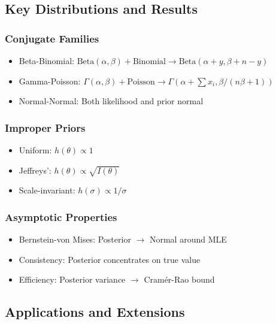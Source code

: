 \subsection{Key Distributions and Results}

\subsubsection{Conjugate Families}

\begin{itemize}
	\item Beta-Binomial: $\text{Beta}(\alpha, \beta) + \text{Binomial} \to \text{Beta}(\alpha + y, \beta + n - y)$
	\item Gamma-Poisson: $\Gamma(\alpha, \beta) + \text{Poisson} \to \Gamma(\alpha + \sum x_i, \beta/(n\beta + 1))$
	\item Normal-Normal: Both likelihood and prior normal
\end{itemize}

\subsubsection{Improper Priors}

\begin{itemize}
	\item Uniform: $h(\theta) \propto 1$
	\item Jeffreys': $h(\theta) \propto \sqrt{I(\theta)}$
	\item Scale-invariant: $h(\sigma) \propto 1/\sigma$
\end{itemize}

\subsubsection{Asymptotic Properties}

\begin{itemize}
	\item Bernstein-von Mises: Posterior $\to$ Normal around MLE
	\item Consistency: Posterior concentrates on true value
	\item Efficiency: Posterior variance $\to$ Cramér-Rao bound
\end{itemize}

\subsection{Applications and Extensions}

